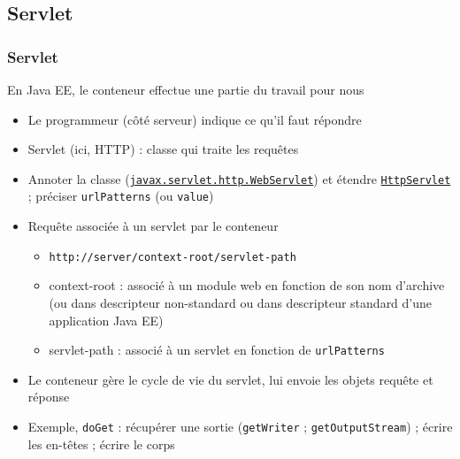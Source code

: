 \documentclass[english, french]{beamer}
\begin{document}
\subsection{Servlet}
\begin{frame}
	\frametitle{Servlet}
	En Java EE, le conteneur effectue une partie du travail pour nous
	\begin{itemize}
		\item Le programmeur (côté serveur) indique ce qu’il faut répondre
		\item Servlet (ici, HTTP) : classe qui traite les requêtes
		\item Annoter la classe (\href{https://docs.oracle.com/javaee/7/api/index.html?javax/servlet/annotation/WebServlet.html}{\texttt{javax.servlet.http.WebServlet}}) et étendre \href{https://docs.oracle.com/javaee/7/api/index.html?javax/servlet/http/HttpServlet.html}{\texttt{HttpServlet}} ; préciser \texttt{urlPatterns} (ou \texttt{value})
		\item Requête associée à un servlet par le conteneur
		\begin{itemize}
			\item \texttt{http://server/context-root/servlet-path}
			\item context-root : associé à un module web en fonction de son nom d’archive (ou dans descripteur non-standard ou dans descripteur standard d’une application Java EE)
			\item servlet-path : associé à un servlet en fonction de \texttt{urlPatterns}
		\end{itemize}
		\item Le conteneur gère le cycle de vie du servlet, lui envoie les objets requête et réponse
		\item Exemple, \texttt{doGet} : récupérer une sortie (\texttt{getWriter} ; \texttt{getOutputStream}) ; écrire les en-têtes ; écrire le corps
	\end{itemize}
\end{frame}
\end{document}
